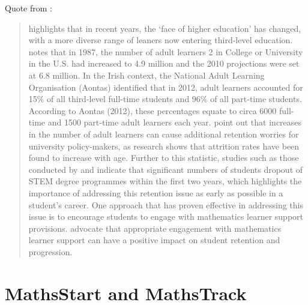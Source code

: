 \documentclass[twoside,12pt,a4paper]{report}
\begin{document}
Quote from \cite{Johnson2016}:
\begin{quote}
	\cite{Hardin2008} highlights that in recent years, the ‘face
of higher education’ has changed, with a more diverse range of leaners now entering
third-level education. \cite{Hardin2008} notes that in 1987, the number of adult learners 2
in College or University in the U.S. had increased to 4.9 million and the 2010 projections
were set at 6.8 million. In the Irish context, the National Adult Learning Organisation
(Aontas) identified that in 2012, adult learners accounted for 15\% of all third-level
full-time students and 96\% of all part-time students. According to Aontas (2012), these
percentages equate to circa 6000 full-time and 1500 part-time adult learners each year.
\cite{Murtaugh1999} point out that increases in the number of adult
learners can cause additional retention worries for university policy-makers, as research
shows that attrition rates have been found to increase with age. Further to this statistic,
studies such as those conducted by \cite{House2000} and \cite{Tsui2007} indicate that significant
numbers of students dropout of STEM degree programmes within the first two years,
which highlights the importance of addressing this retention issue as early as possible
in a student’s career. One approach that has proven effective in addressing this issue is
to encourage students to engage with mathematics learner support provisions. \cite{Lee2008}
 advocate that appropriate engagement with mathematics learner support
can have a positive impact on student retention and progression.
\end{quote}



\section{MathsStart and MathsTrack}
\label{sec:specificcontext}
\end{document}
